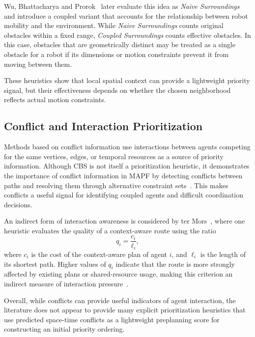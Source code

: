 Wu, Bhattacharya and Prorok~\cite{wu2020pathprospects} later evaluate this idea as
\emph{Naive Surroundings} and introduce a coupled variant that accounts for the relationship between
robot mobility and the environment. While \emph{Naive Surroundings} counts original obstacles within
a fixed range, \emph{Coupled Surroundings} counts effective obstacles. In this case, obstacles that
are geometrically distinct may be treated as a single obstacle for a robot if its dimensions or
motion constraints prevent it from moving between them.

These heuristics show that local spatial context can provide a lightweight priority signal, but their
effectiveness depends on whether the chosen neighborhood reflects actual motion constraints.

\subsection{Conflict and Interaction Prioritization}
\hspace{\parindent}
Methods based on conflict information use interactions between agents competing for the same
vertices, edges, or temporal resources as a source of priority information. Although CBS is not
itself a prioritization heuristic, it demonstrates the importance of conflict information in MAPF by
detecting conflicts between paths and resolving them through alternative constraint
sets~\cite{sharon2015conflict}. This makes conflicts a useful signal for identifying coupled agents
and difficult coordination decisions.

An indirect form of interaction awareness is considered by ter Mors~\cite{termors2011evaluating},
where one heuristic evaluates the quality of a context-aware route using the ratio 
\begin{equation}
q_i = \frac{c_i}{\ell_i},
\end{equation}
where \(c_i\) is the cost of the context-aware plan of agent \(i\), and \(\ell_i\) is the length of
its shortest path. Higher values of \(q_i\) indicate that the route is more strongly affected by
existing plans or shared-resource usage, making this criterion an indirect measure of interaction
pressure~\cite{termors2011evaluating}.

Overall, while conflicts can provide useful indicators of agent interaction, the literature does not
appear to provide many explicit prioritization heuristics that use predicted space-time conflicts as
a lightweight preplanning score for constructing an initial priority ordering.

